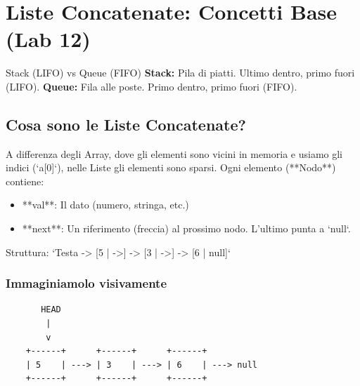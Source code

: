 \section{Liste Concatenate: Concetti Base (Lab 12)}

\begin{concept}{Stack (LIFO) vs Queue (FIFO)}
\textbf{Stack:} Pila di piatti. Ultimo dentro, primo fuori (LIFO).
\textbf{Queue:} Fila alle poste. Primo dentro, primo fuori (FIFO).
\end{concept}

\begin{center}
\end{center}

\subsection{Cosa sono le Liste Concatenate?}
A differenza degli Array, dove gli elementi sono vicini in memoria e usiamo gli indici (`a[0]`), nelle Liste gli elementi sono sparsi.
Ogni elemento (**Nodo**) contiene:
\begin{itemize}
    \item **val**: Il dato (numero, stringa, etc.)
    \item **next**: Un riferimento (freccia) al prossimo nodo. L'ultimo punta a `null`.
\end{itemize}

Struttura: `Testa -> [5 | ->] -> [3 | ->] -> [6 | null]`

\subsubsection{Immaginiamolo visivamente}
\begin{verbatim}
       HEAD
        |
        v
    +------+      +------+      +------+
    | 5    | ---> | 3    | ---> | 6    | ---> null
    +------+      +------+      +------+
\end{verbatim}

